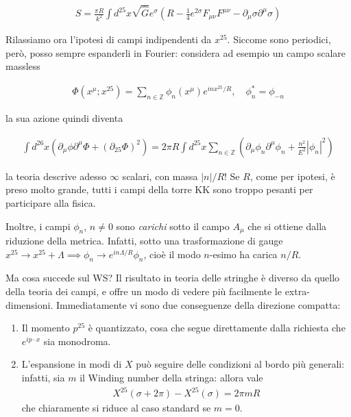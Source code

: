 \documentclass{report}
\begin{document}
\begin{align}
    S = \frac{\pi R}{k^2}\int d^{25}x \sqrt{\hat{G}}e^\sigma \left(R - \frac{1}{4}e^{2\sigma}F_{\mu\nu}F^{\mu\nu} - \partial_\mu \sigma \partial^\mu \sigma \right)
\end{align}

Rilassiamo ora l'ipotesi di campi indipendenti da \(x^{25}\). Siccome sono periodici, però, posso sempre espanderli in Fourier: considera ad esempio un campo scalare massless

\begin{align}
    \Phi(x^\mu; x^{25}) = \sum_{n \in \mathbb{Z}} \phi_n (x^\mu)e^{in x^{25} /R}, \quad \phi_n^* = \phi_{-n}
\end{align}

la sua azione quindi diventa 

\begin{align}
    \int d^{26}x (\partial_\mu \phi \partial^\mu \Phi + (\partial_{25}\Phi)^2) = 2\pi R \int d^{25}x \sum_{n \in \mathbb{Z}} \left(\partial_\mu \phi_n \partial^\mu \phi_n + \frac{n^2}{E^2}|\phi_n|^2\right)
\end{align}

la teoria descrive adesso \(\infty\) scalari, con massa \(|n|/R\)! Se \(R\), come per ipotesi, è preso molto grande, tutti i campi della torre KK sono troppo pesanti per participare alla fisica. 

Inoltre, i campi \(\phi_n\), \(n \neq 0\) sono \emph{carichi} sotto il campo \(A_\mu\) che si ottiene dalla riduzione della metrica. Infatti, sotto una trasformazione di gauge \(x^{25} \to x^{25} + \Lambda \implies \phi_n \to e^{in \Lambda/R}\phi_n\), cioè il modo \(n\)-esimo ha carica \(n/R\). 

Ma cosa succede sul WS? Il risultato in teoria delle stringhe è diverso da quello della teoria dei campi, e offre un modo di vedere più facilmente le extra-dimensioni. Immediatamente vi sono due conseguenze della direzione compatta: 

\begin{enumerate}
    \item Il momento \(p^{25}\) è quantizzato, cosa che segue direttamente dalla richiesta che \(e^{ip\cdot x}\) sia monodroma. 
    \item L'espansione in modi di \(X\) può seguire delle condizioni al bordo più generali: infatti, sia \(m\) il Winding number della stringa: allora vale 
    \begin{align}
        X^{25}(\sigma +2\pi) - X^{25}(\sigma) = 2\pi m R
    \end{align}
    che chiaramente si riduce al caso standard se \(m=0\). 
\end{enumerate}
\end{document}
